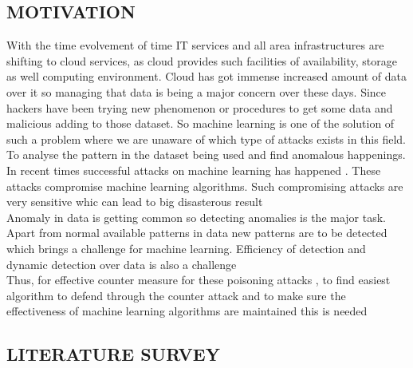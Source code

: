 \documentclass[a4paper, 12pt]{article}
\begin{document}
\newpage
\begin{center}

\section{MOTIVATION}

\end{center}

\hspace{1cm}
With the time evolvement of time IT services and all area infrastructures are shifting to cloud services, as cloud provides such facilities of availability, storage as well computing environment. Cloud has got immense increased amount of data over it so managing that data is being a major concern over these days. Since hackers have been trying new phenomenon or procedures to get some data and malicious adding to those dataset. So machine learning is one of the solution of such a problem where we are unaware of which type of attacks exists in this field. To analyse the pattern in the dataset being used and find anomalous happenings. \\

  

\hspace{1cm} 
In recent times successful attacks on machine learning has happened . These attacks compromise machine learning algorithms. Such compromising attacks are very sensitive whic can lead to big disasterous result\\

\hspace{1cm} Anomaly in data is getting common so detecting anomalies is the major task. Apart from normal available patterns in data new patterns are to be detected which brings a challenge for machine learning. Efficiency of detection and dynamic detection over data is also a challenge
\\

\hspace{1cm} Thus, for effective counter measure for these poisoning attacks , to find easiest algorithm to defend through the counter attack and to make sure the effectiveness of machine learning algorithms are  maintained this is needed\\

\newpage
\begin{center}

\section{LITERATURE SURVEY}

\end{center}
\end{document}
